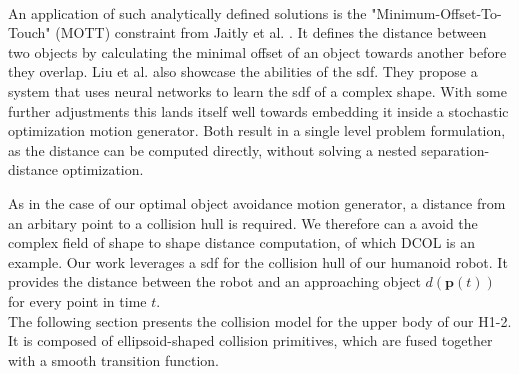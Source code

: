 \\
An application of such analytically defined solutions is the "Minimum-Offset-To-Touch" (MOTT) constraint from Jaitly et al. \cite{jaitly_2025}.
It defines the distance between two objects by calculating the minimal offset of an object towards another before they overlap.
Liu et al. \cite{liu_2023} also showcase the abilities of the \acrshort{sdf}.
They propose a system that uses neural networks to learn the \acrshort{sdf} of a complex shape.
With some further adjustments this lands itself well towards embedding it inside a stochastic optimization motion generator.
Both result in a single level problem formulation, as the distance can be computed directly, without solving a nested separation-distance optimization.
\par
As in the case of our optimal object avoidance motion generator, a distance from an arbitary point to a collision hull is required.
We therefore can a avoid the complex field of shape to shape distance computation, of which DCOL is an example.
Our work leverages a \acrshort{sdf} for the collision hull of our humanoid robot.
It provides the distance between the robot and an approaching object $d(\bm{p}(t))$ for every point in time $t$.
\\
The following section presents the collision model for the upper body of our H1-2.
It is composed of ellipsoid-shaped collision primitives, which are fused together with a smooth transition function.

